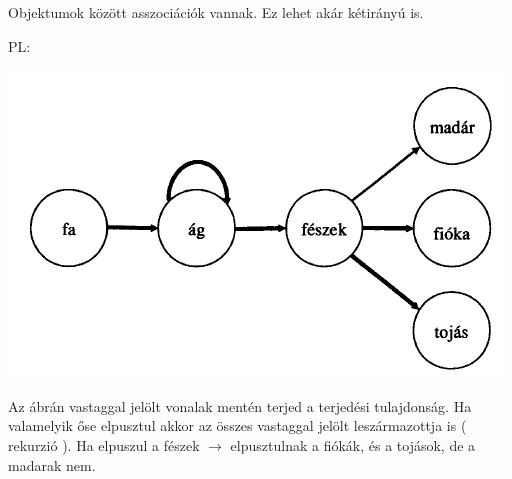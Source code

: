 	Objektumok között asszociációk vannak. Ez lehet akár kétirányú is.

	PL:
	\begin{center}
		\includegraphics[scale=0.6]{img/fa}
	\end{center}

	Az ábrán vastaggal jelölt vonalak mentén terjed a terjedési tulajdonság. Ha valamelyik őse elpusztul akkor az összes vastaggal jelölt leszármazottja is ( rekurzió ). Ha elpuszul a fészek $\rightarrow$ elpusztulnak a fiókák, és a tojások, de a madarak nem.
